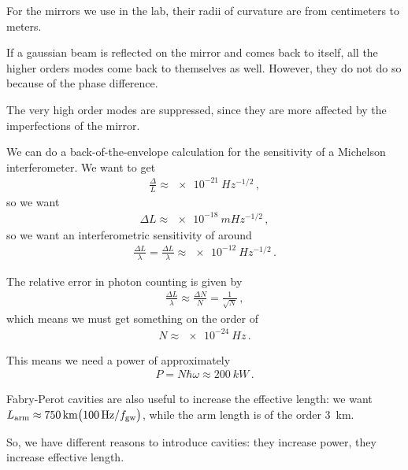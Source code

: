 \documentclass[main.tex]{subfiles}
\begin{document}
For the mirrors we use in the lab, their radii of curvature are from centimeters to meters. 

If a gaussian beam is reflected on the mirror and comes back to itself, all the higher orders modes come back to themselves as well. 
However, they do not do so because of the phase difference.

The very high order modes are suppressed, since they are more affected by the imperfections of the mirror.

We can do a back-of-the-envelope calculation for the sensitivity of a Michelson interferometer. We want to get 
%
\begin{align}
\frac{ \Delta }{L} \approx \SI{e-21}{Hz^{-1/2}}
\,,
\end{align}
%
so we want 
%
\begin{align}
\Delta L \approx \SI{e-18}{m Hz^{-1/2}}
\,,
\end{align}
%
so we want an interferometric sensitivity of around 
%
\begin{align}
\frac{\Delta L}{\lambda } = \frac{\Delta L}{\lambda } \approx \SI{e-12}{Hz^{-1/2}}
\,.
\end{align}

The relative error in photon counting is given by 
%
\begin{align}
\frac{\Delta L}{\lambda } \approx \frac{\Delta N}{N} = \frac{1}{\sqrt{N}}
\,,
\end{align}
%
which means we must get something on the order of 
%
\begin{align}
N \approx \SI{e-24}{Hz}
\,.
\end{align}

This means we need a power of approximately 
%
\begin{align}
P = N \hbar \omega \approx \SI{200}{kW}
\,.
\end{align}

Fabry-Perot cavities are also useful to increase the effective length: we want \(L _{\text{arm}} \approx \SI{750}{km} \qty( \SI{100}{Hz}  / f _{\text{gw}})\), while the arm length is of the order \SI{3}{km}. 

So, we have different reasons to introduce cavities: they increase power, they increase effective length. 
\end{document}
